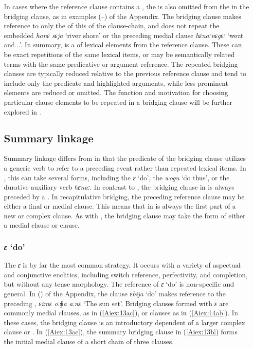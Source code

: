 \documentclass[output=paper]{LSP/langsci}
\begin{document}
In cases where the reference clause contains a , the  is also omitted from the  in the bridging clause, as in examples (--) of the Appendix. The bridging clause makes reference to only the  of this  of the clause-chain, and does not repeat the embedded  \textit{hanɛ sɛja} `river shore' or the preceding medial clause \textit{hɛnaːnɛgɛː} `went and...'. In summary,  is a  of lexical elements from the reference clause. These can be exact repetitions of the same lexical items, or may be semantically related terms with the same predicative or argument reference. The repeated bridging clauses are typically reduced relative to the previous reference clause and tend to include only the predicate and highlighted arguments, while less prominent elements are reduced or omitted. The function and motivation for choosing particular clause elements to be repeated in a bridging clause will be further explored in .


\subsection{Summary linkage} 
\label{AiSum.linkg}
Summary linkage differs from  in that the predicate of the bridging clause utilizes a generic verb to refer to a preceding event rather than repeated lexical items. In , this can take several forms, including the  \textit{ɛ} `do', the  \textit{wogu} `do thus', or the durative auxiliary verb \textit{hɛnaː}. In contrast to , the bridging clause in  is always preceded by a . In recapitulative bridging, the preceding reference clause may be either a final or medial clause. This means that  in  is always the first part of a new  or complex clause. As with , the bridging clause may take the form of either a medial clause or  clause.

\subsubsection{\textit{ɛ} `do'} 
\label{Ailightverb.do}
	The  \textit{ɛ} is by far the most common  strategy. It occurs with a variety of aspectual and conjunctive enclitics, including switch reference, perfectivity, and completion, but without any tense morphology. The reference of \textit{ɛ} `do' is non-specific and general. In () of the Appendix, the  clause \textit{ɛbija} ‘do’ makes reference to the preceding , \textit{ɛimɛ oːɸa aːnɛ} `The sun set'.
Bridging clauses formed with \textit{ɛ} are commonly medial clauses, as in (\ref{Aiex:13ac}), or  clauses as in
(\ref{Aiex:14ab}). In these cases, the bridging clause is an introductory dependent of a larger complex clause or . In (\ref{Aiex:13ac}), the summary bridging clause in (\ref{Aiex:13b}) forms the initial medial clause of a short chain of three clauses.
\end{document}
